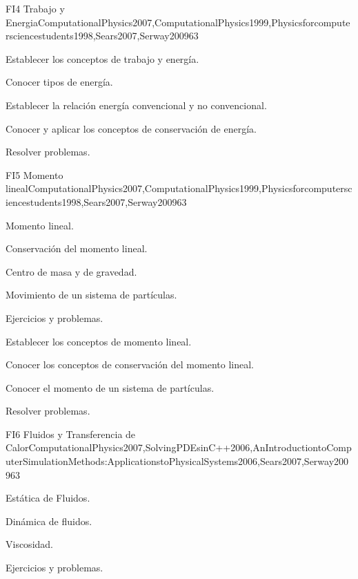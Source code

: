 \begin{syllabus}
\begin{unit}{FI4 Trabajo y Energia}{ComputationalPhysics2007,ComputationalPhysics1999,Physicsforcomputersciencestudents1998,Sears2007,Serway2009}{6}{3}
   \begin{learningoutcomes}
      \item Establecer los conceptos de trabajo y energía.
      \item Conocer tipos de energía.
      \item Establecer la relación energía convencional y no convencional.
      \item Conocer y aplicar los conceptos de conservación de energía.
      \item Resolver problemas.
   \end{learningoutcomes}
\end{unit}

\begin{unit}{FI5 Momento lineal}{ComputationalPhysics2007,ComputationalPhysics1999,Physicsforcomputersciencestudents1998,Sears2007,Serway2009}{6}{3}
\begin{topics}
      \item Momento lineal.
      \item Conservación del momento lineal.
      \item Centro de masa y de gravedad.
      \item Movimiento de un sistema de partículas.
      \item Ejercicios y problemas.
  \end{topics}

   \begin{learningoutcomes}
      \item Establecer los conceptos de momento lineal.
      \item Conocer los conceptos de conservación del momento lineal.
      \item Conocer el momento de un sistema de partículas.
      \item Resolver problemas.
   \end{learningoutcomes}
\end{unit}

\begin{unit}{FI6 Fluidos y Transferencia de Calor}{ComputationalPhysics2007,SolvingPDEsinC++2006,AnIntroductiontoComputerSimulationMethods:ApplicationstoPhysicalSystems2006,Sears2007,Serway2009}{6}{3}
\begin{topics}
      \item Estática de Fluidos.
      \item Dinámica de fluidos. 
      \item Viscosidad.
      \item Ejercicios y problemas.
  \end{topics}


\end{unit}
\end{syllabus}
